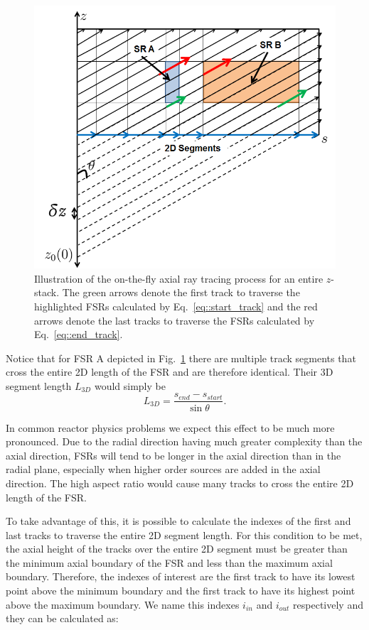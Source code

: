 \begin{figure}[ht!]
	\centering
	\includegraphics[width=0.75\linewidth]{figures/ph2016/stack_tracing.png}
	\caption{Illustration of the on-the-fly axial ray tracing process for an entire $z$-stack. The green arrows denote the first track to traverse the highlighted FSRs calculated by Eq.~\ref{eq::start_track} and the red arrows denote the last tracks to traverse the FSRs calculated by Eq.~\ref{eq::end_track}.}
	\label{fig::stack_tracing}
\end{figure}


Notice that for FSR A depicted in Fig.~\ref{fig::stack_tracing} there are multiple track segments that cross the entire 2D length of the FSR and are therefore identical. Their 3D segment length $L_{3D}$ would simply be
\begin{equation}
L_{3D} = \frac{s_{\textit{end}} - s_{\textit{start}}}{\sin{\theta}}.
\end{equation}

In common reactor physics problems we expect this effect to be much more pronounced. Due to the radial direction having much greater complexity than the axial direction, FSRs will tend to be longer in the axial direction than in the radial plane, especially when higher order sources are added in the axial direction. The high aspect ratio would cause many tracks to cross the entire 2D length of the FSR.

To take advantage of this, it is possible to calculate the indexes of the first and last tracks to traverse the entire 2D segment length. For this condition to be met, the axial height of the tracks over the entire 2D segment must be greater than the minimum axial boundary of the FSR and less than the maximum axial boundary. Therefore, the indexes of interest are the first track to have its lowest point above the minimum boundary and the first track to have its highest point above the maximum boundary. We name this indexes $i_{\textit{in}}$ and $i_{\textit{out}}$ respectively and they can be calculated as:


